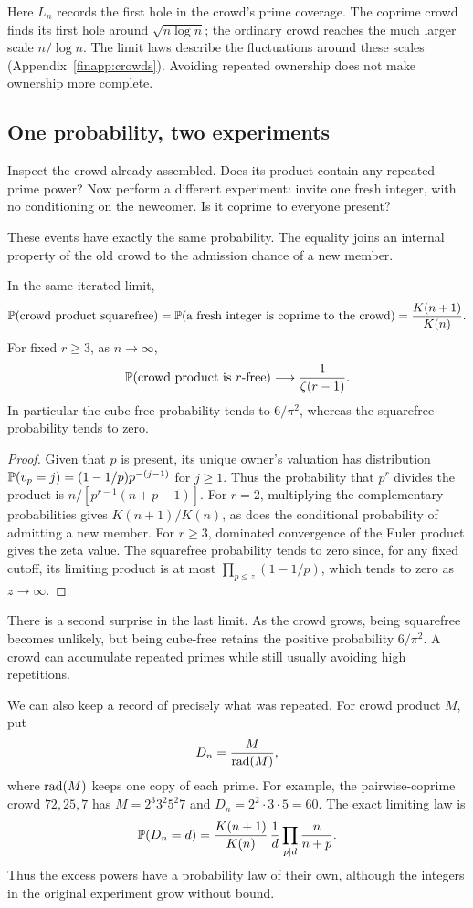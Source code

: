 Here $L_n$ records the first hole in the crowd's prime coverage.
The coprime crowd finds its first hole around $\sqrt{n\log n}$;
the ordinary crowd reaches the much larger scale $n/\log n$.
The limit laws describe the fluctuations around these scales
(Appendix~\ref{finapp:crowds}).
Avoiding repeated ownership does not make ownership more complete.

\subsection{One probability, two experiments}
Inspect the crowd already assembled.  Does its product contain any
repeated prime power?  Now perform a different experiment: invite one
fresh integer, with no conditioning on the newcomer.  Is it coprime
to everyone present?

These events have exactly the same probability.
The equality joins an internal property of the old crowd to the
admission chance of a new member.
\begin{proposition}\label{fin:powers}
In the same iterated limit,
\[
 \mathbb P(\text{crowd product squarefree})
 =\mathbb P(\text{a fresh integer is coprime to the crowd})
 =\frac{K(n+1)}{K(n)}.
\]
For fixed $r\ge3$, as $n\to\infty$,
\[
 \mathbb P(\text{crowd product is }r\text{-free})\longrightarrow
 \frac1{\zeta(r-1)}.
\]
In particular the cube-free probability tends to $6/\pi^2$, whereas
the squarefree probability tends to zero.
\end{proposition}
\begin{proof}
Given that $p$ is present, its unique owner's valuation has distribution
$\mathbb P(v_p=j)=(1-1/p)p^{-(j-1)}$ for $j\ge1$.  Thus the probability
that $p^r$ divides the product is
$n/[p^{r-1}(n+p-1)]$.  For $r=2$, multiplying the complementary
probabilities gives $K(n+1)/K(n)$, as does the conditional probability
of admitting a new member.  For $r\ge3$, dominated convergence of the
Euler product gives the zeta value.  The squarefree probability tends
to zero since, for any fixed cutoff, its limiting product is at most
$\prod_{p\le z}(1-1/p)$, which tends to zero as $z\to\infty$.
\end{proof}

There is a second surprise in the last limit.  As the crowd grows,
being squarefree becomes unlikely, but being cube-free retains the
positive probability $6/\pi^2$.  A crowd can accumulate repeated
primes while still usually avoiding high repetitions.

We can also keep a record of precisely what was repeated.
For crowd product $M$, put
\[
 D_n=\frac{M}{\operatorname{rad}(M)},
\]
where $\operatorname{rad}(M)$ keeps one copy of each prime.
For example, the pairwise-coprime crowd $72,25,7$ has
$M=2^3 3^2 5^2 7$ and $D_n=2^2\cdot3\cdot5=60$.
The exact limiting law is
\begin{equation}\label{fin:remainderlaw}
 \mathbb P(D_n=d)=\frac{K(n+1)}{K(n)}\,\frac1d
                    \prod_{p\mid d}\frac n{n+p}.
\end{equation}
Thus the excess powers have a probability law of their own, although
the integers in the original experiment grow without bound.

